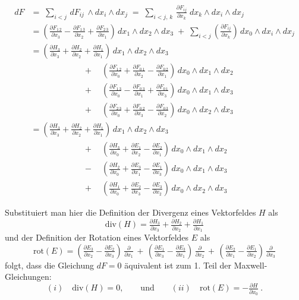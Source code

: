 \documentclass[12pt,a4paper]{article}
\begin{document}
$$
\begin{array}{rl}
d F  & =\; \sum_{i<j} \, dF_{ij} \, \wedge dx_i \wedge dx_j
\;=\; \sum_{i<j,\, k} \, \frac{\partial F_{ij}}{\partial x_k} \; dx_k \wedge dx_i \wedge dx_j \\[2ex]
& =
(\frac{\partial F_{1\,2}}{\partial x_3} - \frac{\partial F_{1\,3}}{\partial x_2} + \frac{\partial F_{2\,3}}{\partial x_1})\,
dx_1 \wedge dx_2 \wedge dx_3
\;+\;
\sum_{i<j} (\frac{\partial F_{ij}}{\partial x_k})\, dx_0 \wedge dx_i \wedge dx_j \\[2ex]
& =
(\frac{\partial H_3}{\partial x_3} + \frac{\partial H_2}{\partial x_2} + \frac{\partial H_1}{\partial x_1})\,
dx_1 \wedge dx_2 \wedge dx_3 \\[1.5ex]
& \phantom{xxxxxxxxxxx} + \quad
(\frac{\partial F_{1\,2}}{\partial x_0} + \frac{\partial F_{0\,1}}{\partial x_2} - \frac{\partial F_{0\,2}}{\partial x_1})\,
dx_0 \wedge dx_1 \wedge dx_2 \\[1.5ex]
& \phantom{xxxxxxxxxxx} + \quad
(\frac{\partial F_{1\,3}}{\partial x_0} - \frac{\partial F_{0\,3}}{\partial x_1} + \frac{\partial F_{0\,1}}{\partial x_3})\,
dx_0 \wedge dx_1 \wedge dx_3 \\[1.5ex]
& \phantom{xxxxxxxxxxx}  + \quad
(\frac{\partial F_{2\,3}}{\partial x_0} + \frac{\partial F_{0\,2}}{\partial x_3} - \frac{\partial F_{0\,3}}{\partial x_2})\,
dx_0 \wedge dx_2 \wedge dx_3 \\[2ex]
& =
(\frac{\partial H_3}{\partial x_3} + \frac{\partial H_2}{\partial x_2} + \frac{\partial H_1}{\partial x_1}) \,
dx_1 \wedge dx_2 \wedge dx_3 \\[1.5ex]
& \phantom{xxxxxxxxxxx} + \quad
(\frac{\partial H_3}{\partial x_0} + \frac{\partial E_1}{\partial x_2} - \frac{\partial E_2}{\partial x_1})\,
dx_0 \wedge dx_1 \wedge dx_2 \\[1.5ex]
& \phantom{xxxxxxxxxxx} - \quad
( \frac{\partial H_2}{\partial x_0} + \frac{\partial E_3}{\partial x_1} - \frac{\partial E_1}{\partial x_3})\,
dx_0 \wedge dx_1 \wedge dx_3 \\[1.5ex]
& \phantom{xxxxxxxxxxx}  + \quad
(\frac{\partial H_1}{\partial x_0} + \frac{\partial E_2}{\partial x_3} - \frac{\partial E_3}{\partial x_2})\,
dx_0 \wedge dx_2 \wedge dx_3
\end{array}
$$

Substituiert man hier die Definition der Divergenz eines Vektorfeldes $H$ als
$$
\mathrm{div}(H) = \tfrac{\partial H_3}{\partial x_3} + \tfrac{\partial H_2}{\partial x_2} + \tfrac{\partial H_1}{\partial x_1}
$$
und der Definition der Rotation eines Vektorfeldes $E$ als
$$
\mathrm{rot} (E) =
(\tfrac{\partial E_3}{\partial x_2} - \tfrac{\partial E_2}{\partial x_3}) \, \tfrac{\partial}{\partial x_1}
\,+\,
(\tfrac{\partial E_1}{\partial x_3} - \tfrac{\partial E_3}{\partial x_1}) \, \tfrac{\partial}{\partial x_2}
\,+\,
(\tfrac{\partial E_2}{\partial x_1} - \tfrac{\partial E_1}{\partial x_2}) \, \tfrac{\partial}{\partial x_3}
$$
folgt, dass die Gleichung $dF = 0$ \"aquivalent ist zum 1. Teil der Maxwell-Gleichungen:
$$
(i) \quad \mathrm{div} (H) = 0, \qquad \mbox{und} \qquad (ii) \quad \mathrm{rot} (E) = - \tfrac{\partial H}{\partial x_0} \ .
$$
\end{document}
